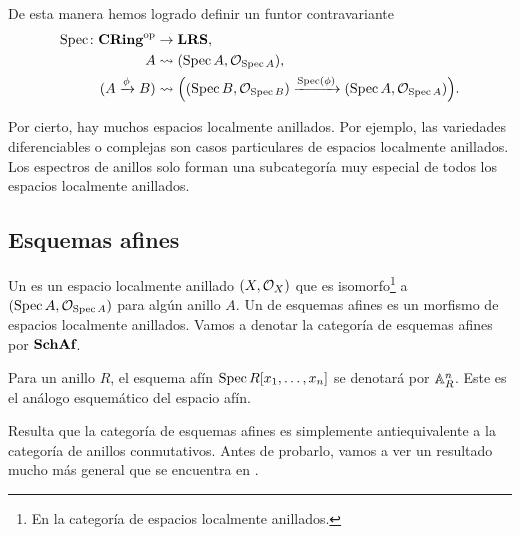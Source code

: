 \documentclass{article}
\numberwithin{equation}{section}
\theoremstyle{definition}
\begin{document}
\vspace{1em}

De esta manera hemos logrado definir un funtor contravariante
\begin{align*}
  \Spec\colon \categ{CRing}^\mathrm{op} & \to \categ{LRS},\\
  A & \rightsquigarrow (\Spec A, \O_{\Spec A}),\\
  (A\xrightarrow{\phi} B) & \rightsquigarrow \Bigl((\Spec B, \O_{\Spec B}) \xrightarrow{\Spec (\phi)} (\Spec A, \O_{\Spec A})\Bigl).
\end{align*}

Por cierto, hay muchos espacios localmente anillados. Por ejemplo,
las variedades diferenciables o complejas son casos particulares de espacios
localmente anillados. Los espectros de anillos solo forman una subcategoría muy
especial de todos los espacios localmente anillados.

\subsection{Esquemas afines}

\begin{definicion}
  \label{dfn:esquemas-afines}
  Un  es un espacio localmente anillado $(X,\O_X)$ que
  es isomorfo\footnote{En la categoría de espacios localmente anillados.}
  a $(\Spec A, \O_{\Spec A})$ para algún anillo $A$. Un 
  de esquemas afines es un morfismo de espacios localmente anillados.
  Vamos a denotar la categoría de esquemas afines por $\categ{SchAf}$.
\end{definicion}


\begin{ejemplo}
  \label{ejemplo:AnR}
  Para un anillo $R$, el esquema afín $\Spec R [x_1,\ldots,x_n]$ se denotará
  por $\AA^n_R$. Este es el análogo esquemático del espacio afín.
\end{ejemplo}

Resulta que la categoría de esquemas afines es simplemente antiequivalente
a la categoría de anillos conmutativos. Antes de probarlo, vamos a ver
un resultado mucho más general que se encuentra en \cite[1.6.3]{EGAI-new}.
\end{document}
